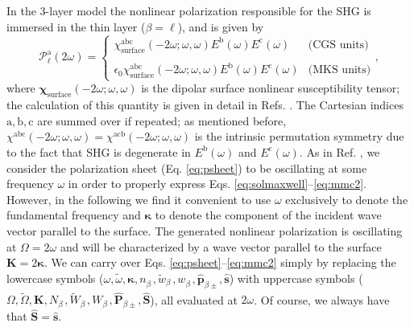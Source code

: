 \documentclass[aps,pra,10pt,amsmath,notitlepage,letterpaper]{revtex4-1}
\begin{document}
In the 3-layer model the nonlinear polarization responsible for the SHG is
immersed in the thin layer ($\beta=\ell$), and is given by
\begin{equation}\label{eq:tres}
\mathcal{P}^{\mathrm{a}}_{\ell}(2\omega) =
\left\{
\begin{array}{cc}
\chi^{\mathrm{abc}}_{\mathrm{surface}}(-2\omega;\omega,\omega)
    E^{\mathrm{b}}(\omega)E^{\mathrm{c}}(\omega)
    & \text{(CGS units)}\\\\
\epsilon_{0}\chi^{\mathrm{abc}}_{\mathrm{surface}}(-2\omega;\omega,\omega)
    E^{\mathrm{b}}(\omega)E^{\mathrm{c}}(\omega)
    & \text{(MKS units)}
\end{array}
\right.,
\end{equation}
where $\boldsymbol{\chi}_{\mathrm{surface}}(-2\omega;\omega,\omega)$ is the
dipolar surface nonlinear susceptibility tensor; the calculation of this
quantity is given in detail in Refs. \cite{andersonPRB15, andersonthesis}. The
Cartesian indices $\mathrm{a,b,c}$ are summed over if repeated; as mentioned
before, $\chi^{\mathrm{abc}}(-2\omega;\omega,\omega) =
\chi^{\mathrm{acb}}(-2\omega;\omega,\omega)$ is the intrinsic permutation
symmetry due to the fact that SHG is degenerate in $E^{\mathrm{b}}(\omega)$ and
$E^{\mathrm{c}}(\omega)$. As in Ref. \cite{mizrahiJOSA88}, we consider the
polarization sheet (Eq. \eqref{eq:psheet}) to be oscillating at some frequency
$\omega$ in order to properly express Eqs.
\eqref{eq:solmaxwell}--\eqref{eq:mmc2}. However, in the following we find it
convenient to use $\omega$ exclusively to denote the fundamental frequency and
$\boldsymbol{\kappa}$ to denote the component of the incident wave vector
parallel to the surface. The generated nonlinear polarization is oscillating at
$\Omega = 2\omega$ and will be characterized by a wave vector parallel to the
surface $\mathbf{K} = 2\boldsymbol{\kappa}$. We can carry over Eqs.
\eqref{eq:psheet}--\eqref{eq:mmc2} simply by replacing the lowercase symbols
($\omega,\tilde{\omega},\boldsymbol{\kappa},n^{\phantom{A}}_{\beta},
\tilde{w}^{\phantom{A}}_{\beta},w^{\phantom{A}}_{\beta},
\hat{\mathbf{p}}^{\phantom{A}}_{\beta\pm},\hat{\mathbf{s}}$) with uppercase
symbols ($\Omega,\tilde{\Omega},\mathbf{K},N^{\phantom{A}}_{\beta},
\tilde{W}^{\phantom{A}}_{\beta},W^{\phantom{A}}_{\beta},
\hat{\mathbf{P}}_{\beta\pm},\hat{\mathbf{S}}$), all evaluated at $2\omega$. Of
course, we always have that $\hat{\mathbf{S}}=\hat{\mathbf{s}}$.
\end{document}
